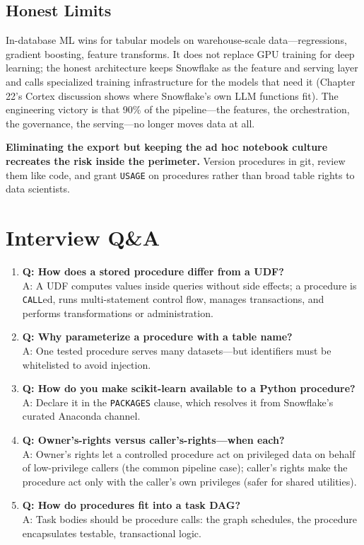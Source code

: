 \subsection{Honest Limits}
In-database ML wins for tabular models on warehouse-scale data---regressions, gradient boosting, feature transforms. It does not replace GPU training for deep learning; the honest architecture keeps Snowflake as the feature and serving layer and calls specialized training infrastructure for the models that need it (Chapter 22's Cortex discussion shows where Snowflake's own LLM functions fit). The engineering victory is that 90\% of the pipeline---the features, the orchestration, the governance, the serving---no longer moves data at all.

\begin{pitfall}
\textbf{Eliminating the export but keeping the ad hoc notebook culture recreates the risk inside the perimeter.} Version procedures in git, review them like code, and grant \texttt{USAGE} on procedures rather than broad table rights to data scientists.
\end{pitfall}

\section{Interview Q\&A}
\begin{enumerate}
    \item \textbf{Q: How does a stored procedure differ from a UDF?}\\
    A: A UDF computes values inside queries without side effects; a procedure is \texttt{CALL}ed, runs multi-statement control flow, manages transactions, and performs transformations or administration.
    \item \textbf{Q: Why parameterize a procedure with a table name?}\\
    A: One tested procedure serves many datasets---but identifiers must be whitelisted to avoid injection.
    \item \textbf{Q: How do you make scikit-learn available to a Python procedure?}\\
    A: Declare it in the \texttt{PACKAGES} clause, which resolves it from Snowflake's curated Anaconda channel.
    \item \textbf{Q: Owner's-rights versus caller's-rights---when each?}\\
    A: Owner's rights let a controlled procedure act on privileged data on behalf of low-privilege callers (the common pipeline case); caller's rights make the procedure act only with the caller's own privileges (safer for shared utilities).
    \item \textbf{Q: How do procedures fit into a task DAG?}\\
    A: Task bodies should be procedure calls: the graph schedules, the procedure encapsulates testable, transactional logic.
\end{enumerate}

